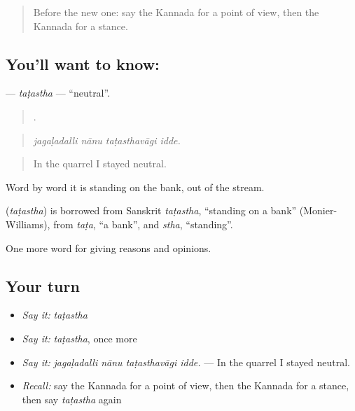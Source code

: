 \label{lesson:KA-C378-tatastha}



\begin{quote}
Before the new one: say the Kannada for a point of view, then the Kannada for a stance.
\end{quote}

\subsection*{You'll want to know: }
\textbf{} — \emph{taṭastha} — \textquotedblleft{}neutral\textquotedblright{}.

\begin{quote}
   .
\end{quote}

\begin{quote}
\emph{jagaḷadalli nānu taṭasthavāgi idde.}
\end{quote}

\begin{quote}
In the quarrel I stayed neutral.
\end{quote}

Word by word it is standing on the bank, out of the stream.

\begin{cousinweb}
\textbf{} (\emph{taṭastha}) is borrowed from Sanskrit \emph{taṭastha}, \textquotedblleft{}standing on a bank\textquotedblright{} (Monier-Williams), from \emph{taṭa}, \textquotedblleft{}a bank\textquotedblright{}, and \emph{stha}, \textquotedblleft{}standing\textquotedblright{}.
\end{cousinweb}

\begin{grammarlens}[title={What you've built}]
One more word for giving reasons and opinions.
\end{grammarlens}

\subsection*{Your turn}
\begin{itemize}
\raggedright
  \item \emph{Say it:} \emph{taṭastha}
  \item \emph{Say it:} \emph{taṭastha}, once more
  \item \emph{Say it:} \emph{jagaḷadalli nānu taṭasthavāgi idde.} — In the quarrel I stayed neutral.
  \item \emph{Recall:} say the Kannada for a point of view, then the Kannada for a stance, then say \emph{taṭastha} again
\end{itemize}

